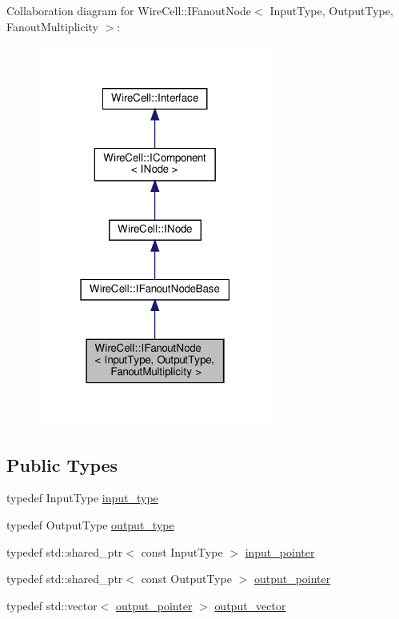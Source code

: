 Collaboration diagram for Wire\+Cell\+:\+:I\+Fanout\+Node$<$ Input\+Type, Output\+Type, Fanout\+Multiplicity $>$\+:
\nopagebreak
\begin{figure}[H]
\begin{center}
\leavevmode
\includegraphics[width=219pt]{class_wire_cell_1_1_i_fanout_node__coll__graph}
\end{center}
\end{figure}
\subsection*{Public Types}
\begin{DoxyCompactItemize}
\item 
typedef Input\+Type \hyperlink{class_wire_cell_1_1_i_fanout_node_a4d7d57d210a8918c1495df2c700e61e8}{input\+\_\+type}
\item 
typedef Output\+Type \hyperlink{class_wire_cell_1_1_i_fanout_node_ac0d2826bcbce6d163d2dbab937f41828}{output\+\_\+type}
\item 
typedef std\+::shared\+\_\+ptr$<$ const Input\+Type $>$ \hyperlink{class_wire_cell_1_1_i_fanout_node_aefd36d56a531edf1990fe6e263d9c266}{input\+\_\+pointer}
\item 
typedef std\+::shared\+\_\+ptr$<$ const Output\+Type $>$ \hyperlink{class_wire_cell_1_1_i_fanout_node_a35939afef5c102eaee685b52c4beaf04}{output\+\_\+pointer}
\item 
typedef std\+::vector$<$ \hyperlink{class_wire_cell_1_1_i_fanout_node_a35939afef5c102eaee685b52c4beaf04}{output\+\_\+pointer} $>$ \hyperlink{class_wire_cell_1_1_i_fanout_node_a650cda83709781daac2d67af7c3706df}{output\+\_\+vector}
\end{DoxyCompactItemize}
